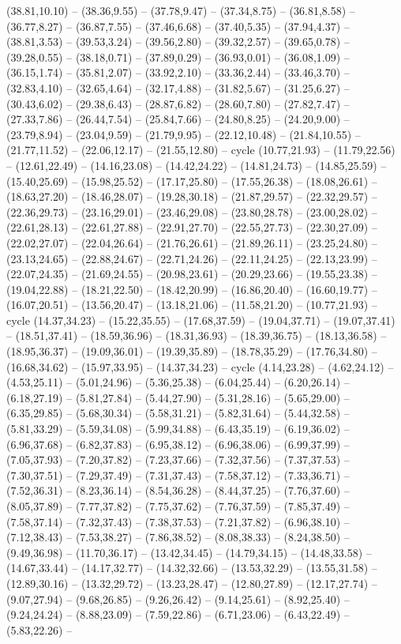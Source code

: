 {(38.81,10.10) -- (38.36,9.55) -- (37.78,9.47) -- (37.34,8.75) -- (36.81,8.58) -- (36.77,8.27) -- (36.87,7.55) -- (37.46,6.68) -- (37.40,5.35) -- (37.94,4.37) -- (38.81,3.53) -- (39.53,3.24) -- (39.56,2.80) -- (39.32,2.57) -- (39.65,0.78) -- (39.28,0.55) -- (38.18,0.71) -- (37.89,0.29) -- (36.93,0.01) -- (36.08,1.09) -- (36.15,1.74) -- (35.81,2.07) -- (33.92,2.10) -- (33.36,2.44) -- (33.46,3.70) -- (32.83,4.10) -- (32.65,4.64) -- (32.17,4.88) -- (31.82,5.67) -- (31.25,6.27) -- (30.43,6.02) -- (29.38,6.43) -- (28.87,6.82) -- (28.60,7.80) -- (27.82,7.47) -- (27.33,7.86) -- (26.44,7.54) -- (25.84,7.66) -- (24.80,8.25) -- (24.20,9.00) -- (23.79,8.94) -- (23.04,9.59) -- (21.79,9.95) -- (22.12,10.48) -- (21.84,10.55) -- (21.77,11.52) -- (22.06,12.17) -- (21.55,12.80) -- cycle (10.77,21.93) -- (11.79,22.56) -- (12.61,22.49) -- (14.16,23.08) -- (14.42,24.22) -- (14.81,24.73) -- (14.85,25.59) -- (15.40,25.69) -- (15.98,25.52) -- (17.17,25.80) -- (17.55,26.38) -- (18.08,26.61) -- (18.63,27.20) -- (18.46,28.07) -- (19.28,30.18) -- (21.87,29.57) -- (22.32,29.57) -- (22.36,29.73) -- (23.16,29.01) -- (23.46,29.08) -- (23.80,28.78) -- (23.00,28.02) -- (22.61,28.13) -- (22.61,27.88) -- (22.91,27.70) -- (22.55,27.73) -- (22.30,27.09) -- (22.02,27.07) -- (22.04,26.64) -- (21.76,26.61) -- (21.89,26.11) -- (23.25,24.80) -- (23.13,24.65) -- (22.88,24.67) -- (22.71,24.26) -- (22.11,24.25) -- (22.13,23.99) -- (22.07,24.35) -- (21.69,24.55) -- (20.98,23.61) -- (20.29,23.66) -- (19.55,23.38) -- (19.04,22.88) -- (18.21,22.50) -- (18.42,20.99) -- (16.86,20.40) -- (16.60,19.77) -- (16.07,20.51) -- (13.56,20.47) -- (13.18,21.06) -- (11.58,21.20) -- (10.77,21.93) -- cycle (14.37,34.23) -- (15.22,35.55) -- (17.68,37.59) -- (19.04,37.71) -- (19.07,37.41) -- (18.51,37.41) -- (18.59,36.96) -- (18.31,36.93) -- (18.39,36.75) -- (18.13,36.58) -- (18.95,36.37) -- (19.09,36.01) -- (19.39,35.89) -- (18.78,35.29) -- (17.76,34.80) -- (16.68,34.62) -- (15.97,33.95) -- (14.37,34.23) -- cycle (4.14,23.28) -- (4.62,24.12) -- (4.53,25.11) -- (5.01,24.96) -- (5.36,25.38) -- (6.04,25.44) -- (6.20,26.14) -- (6.18,27.19) -- (5.81,27.84) -- (5.44,27.90) -- (5.31,28.16) -- (5.65,29.00) -- (6.35,29.85) -- (5.68,30.34) -- (5.58,31.21) -- (5.82,31.64) -- (5.44,32.58) -- (5.81,33.29) -- (5.59,34.08) -- (5.99,34.88) -- (6.43,35.19) -- (6.19,36.02) -- (6.96,37.68) -- (6.82,37.83) -- (6.95,38.12) -- (6.96,38.06) -- (6.99,37.99) -- (7.05,37.93) -- (7.20,37.82) -- (7.23,37.66) -- (7.32,37.56) -- (7.37,37.53) -- (7.30,37.51) -- (7.29,37.49) -- (7.31,37.43) -- (7.58,37.12) -- (7.33,36.71) -- (7.52,36.31) -- (8.23,36.14) -- (8.54,36.28) -- (8.44,37.25) -- (7.76,37.60) -- (8.05,37.89) -- (7.77,37.82) -- (7.75,37.62) -- (7.76,37.59) -- (7.85,37.49) -- (7.58,37.14) -- (7.32,37.43) -- (7.38,37.53) -- (7.21,37.82) -- (6.96,38.10) -- (7.12,38.43) -- (7.53,38.27) -- (7.86,38.52) -- (8.08,38.33) -- (8.24,38.50) -- (9.49,36.98) -- (11.70,36.17) -- (13.42,34.45) -- (14.79,34.15) -- (14.48,33.58) -- (14.67,33.44) -- (14.17,32.77) -- (14.32,32.66) -- (13.53,32.29) -- (13.55,31.58) -- (12.89,30.16) -- (13.32,29.72) -- (13.23,28.47) -- (12.80,27.89) -- (12.17,27.74) -- (9.07,27.94) -- (9.68,26.85) -- (9.26,26.42) -- (9.14,25.61) -- (8.92,25.40) -- (9.24,24.24) -- (8.88,23.09) -- (7.59,22.86) -- (6.71,23.06) -- (6.43,22.49) -- (5.83,22.26) -- }
